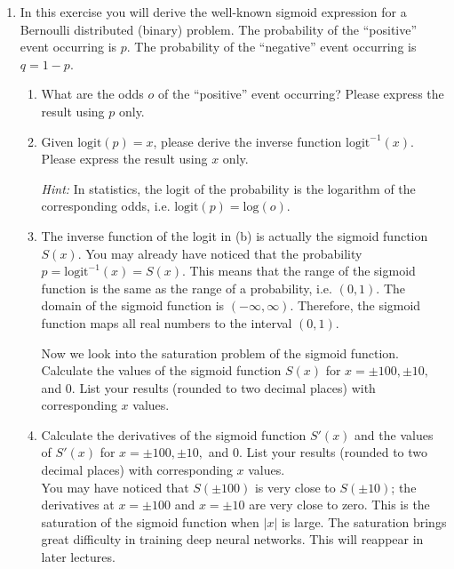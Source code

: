 \documentclass[a4paper]{article}
\begin{document}
\begin{enumerate}
\item	In this exercise you will derive the well-known sigmoid expression for a Bernoulli distributed (binary) problem. The probability of the ``positive'' event occurring is $p$. The probability of the ``negative'' event occurring is $q=1-p$.

\begin{enumerate}
	\item What are the odds $o$ of the ``positive'' event occurring? Please express the result using $p$ only.
	
	\item Given $\textrm{logit}(p)=x$, please derive the inverse function $\textrm{logit}^{-1}(x)$. Please express the result using $x$ only.
	
	\textit{Hint:} In statistics, the logit of the probability is the logarithm of the corresponding odds, i.e. $\textrm{logit}(p)=\textrm{log}(o)$.
		
	\item The inverse function of the logit in (b) is actually the sigmoid function $S(x)$. You may already have noticed that the probability $p = \textrm{logit}^{-1}(x) = S(x)$. This means that the range of the sigmoid function is the same as the range of a probability, i.e. $(0, 1)$. The domain of the sigmoid function is $(-\infty, \infty)$. Therefore, the sigmoid function maps all real numbers to the interval $(0, 1)$. 

	Now we look into the saturation problem of the sigmoid function. Calculate the values of the sigmoid function $S(x)$ for $x=\pm100, \pm10,$ and $0$. List your results (rounded to two decimal places) with corresponding $x$ values.

	\item Calculate the derivatives of the sigmoid function $S'(x)$ and the values of $S'(x)$ for $x=\pm100, \pm10,$ and $0$. List your results (rounded to two decimal places) with corresponding $x$ values.\\
	
	You may have noticed that $S(\pm100)$ is very close to $S(\pm10)$; the derivatives at $x=\pm100$ and $x=\pm10$ are very close to zero. This is the saturation of the sigmoid function when $|x|$ is large. The saturation brings great difficulty in training deep neural networks. This will reappear in later lectures.

\end{enumerate}



\end{enumerate}
\end{document}
